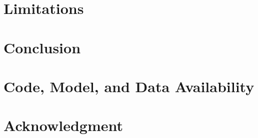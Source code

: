 \documentclass[journal]{IEEEtran}
\begin{document}
\section{Limitations}
\label{sec:limitations}


\section{Conclusion}
\label{sec:conclusion}


\section*{Code, Model, and Data Availability}


\section*{Acknowledgment}




\end{document}
